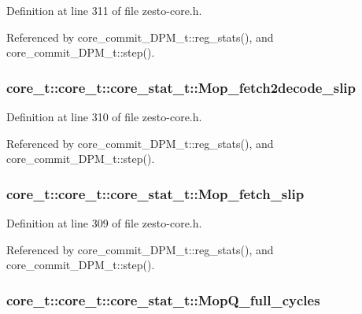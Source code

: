 Definition at line 311 of file zesto-core.h.

Referenced by core\_\-commit\_\-DPM\_\-t::reg\_\-stats(), and core\_\-commit\_\-DPM\_\-t::step().
\subsubsection[{Mop\_\-fetch2decode\_\-slip}]{ core\_\-t::core\_\-t::core\_\-stat\_\-t::Mop\_\-fetch2decode\_\-slip}\label{structcore__t_1_1core__stat__t_b64f8c00b6daf64bb83abecc174be7a6}




Definition at line 310 of file zesto-core.h.

Referenced by core\_\-commit\_\-DPM\_\-t::reg\_\-stats(), and core\_\-commit\_\-DPM\_\-t::step().
\subsubsection[{Mop\_\-fetch\_\-slip}]{ core\_\-t::core\_\-t::core\_\-stat\_\-t::Mop\_\-fetch\_\-slip}\label{structcore__t_1_1core__stat__t_a15f0041c9b3bed648185155199f5718}




Definition at line 309 of file zesto-core.h.

Referenced by core\_\-commit\_\-DPM\_\-t::reg\_\-stats(), and core\_\-commit\_\-DPM\_\-t::step().
\subsubsection[{MopQ\_\-full\_\-cycles}]{ core\_\-t::core\_\-t::core\_\-stat\_\-t::MopQ\_\-full\_\-cycles}\label{structcore__t_1_1core__stat__t_a9e4d315b27d71b8bafcdf8edb1d0682}




